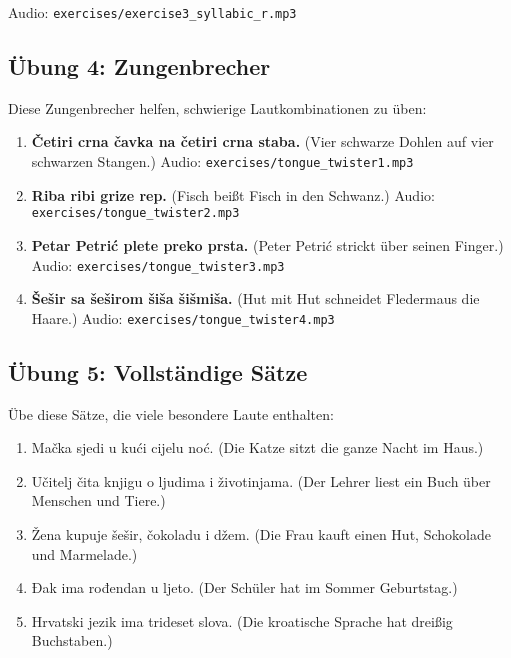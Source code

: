 Audio: \texttt{exercises/exercise3\_syllabic\_r.mp3}

\subsection{Übung 4: Zungenbrecher}

Diese Zungenbrecher helfen, schwierige Lautkombinationen zu üben:

\begin{enumerate}
    \item \textbf{Četiri crna čavka na četiri crna staba.}
    (Vier schwarze Dohlen auf vier schwarzen Stangen.)
    Audio: \texttt{exercises/tongue\_twister1.mp3}
    
    \item \textbf{Riba ribi grize rep.}
    (Fisch beißt Fisch in den Schwanz.)
    Audio: \texttt{exercises/tongue\_twister2.mp3}
    
    \item \textbf{Petar Petrić plete preko prsta.}
    (Peter Petrić strickt über seinen Finger.)
    Audio: \texttt{exercises/tongue\_twister3.mp3}
    
    \item \textbf{Šešir sa šeširom šiša šišmiša.}
    (Hut mit Hut schneidet Fledermaus die Haare.)
    Audio: \texttt{exercises/tongue\_twister4.mp3}
\end{enumerate}

\subsection{Übung 5: Vollständige Sätze}

Übe diese Sätze, die viele besondere Laute enthalten:

\begin{enumerate}
    \item Mačka sjedi u kući cijelu noć.
    (Die Katze sitzt die ganze Nacht im Haus.)
    
    \item Učitelj čita knjigu o ljudima i životinjama.
    (Der Lehrer liest ein Buch über Menschen und Tiere.)
    
    \item Žena kupuje šešir, čokoladu i džem.
    (Die Frau kauft einen Hut, Schokolade und Marmelade.)
    
    \item Đak ima rođendan u ljeto.
    (Der Schüler hat im Sommer Geburtstag.)
    
    \item Hrvatski jezik ima trideset slova.
    (Die kroatische Sprache hat dreißig Buchstaben.)
\end{enumerate}

